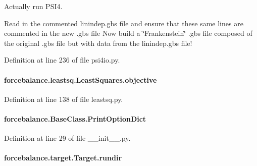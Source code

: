 Actually run P\-S\-I4. 

Read in the commented linindep.\-gbs file and ensure that these same lines are commented in the new .gbs file Now build a \char`\"{}\-Frankenstein\char`\"{} .gbs file composed of the original .gbs file but with data from the linindep.\-gbs file! 

Definition at line 236 of file psi4io.\-py.

\hypertarget{classforcebalance_1_1leastsq_1_1LeastSquares_a169fd8ca94e8f36539ec4ccfa0af4902}{
\paragraph[{objective}]{\setlength{\rightskip}{0pt plus 5cm}forcebalance.\-leastsq.\-Least\-Squares.\-objective\hspace{0.3cm}{\ttfamily [inherited]}}}\label{classforcebalance_1_1leastsq_1_1LeastSquares_a169fd8ca94e8f36539ec4ccfa0af4902}


Definition at line 138 of file leastsq.\-py.

\hypertarget{classforcebalance_1_1BaseClass_afc6659278497d7245bc492ecf405ccae}{
\paragraph[{Print\-Option\-Dict}]{\setlength{\rightskip}{0pt plus 5cm}forcebalance.\-Base\-Class.\-Print\-Option\-Dict\hspace{0.3cm}{\ttfamily [inherited]}}}\label{classforcebalance_1_1BaseClass_afc6659278497d7245bc492ecf405ccae}


Definition at line 29 of file \-\_\-\-\_\-init\-\_\-\-\_\-.\-py.

\hypertarget{classforcebalance_1_1target_1_1Target_a6872de5b2d4273b82336ea5b0da29c9e}{
\paragraph[{rundir}]{\setlength{\rightskip}{0pt plus 5cm}forcebalance.\-target.\-Target.\-rundir\hspace{0.3cm}{\ttfamily [inherited]}}}\label{classforcebalance_1_1target_1_1Target_a6872de5b2d4273b82336ea5b0da29c9e}


